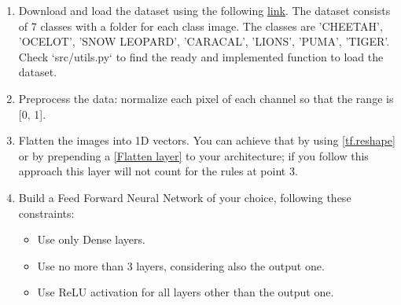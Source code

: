\documentclass[11pt]{scrartcl}
\begin{document}
\begin{enumerate}
\item Download and load the dataset using the following \href{https://drive.switch.ch/index.php/s/XSnhQDNar7y46oQ}{link}. The dataset consists of 7 classes with a folder for each class image. The classes are 'CHEETAH', 'OCELOT', 'SNOW LEOPARD', 'CARACAL', 'LIONS', 'PUMA', 'TIGER'. Check `src/utils.py` to find the ready and implemented function to load the dataset. 

\item Preprocess the data: normalize each pixel of each channel so that the range is [0, 1].

\item Flatten the images into 1D vectors. You can achieve that by using \href{https://www.tensorflow.org/api_docs/python/tf/reshape}{[tf.reshape]} or by prepending a \href{https://keras.io/api/layers/reshaping_layers/flatten/}{[Flatten layer]} to your architecture; if you follow this approach this layer will not count for the rules at point 3.

\item Build a Feed Forward Neural Network of your choice, following these constraints:
\begin{itemize}
	\item Use only Dense layers.
	\item Use no more than 3 layers, considering also the output one.
	\item Use ReLU activation for all layers other than the output one.
\end{itemize}


\end{enumerate}
\end{document}
